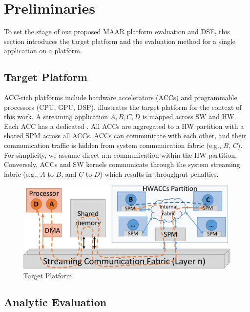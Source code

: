 \vspace{-2pt}
\section{Preliminaries}
\label{sec:pre}

To set the stage of our proposed MAAR platform evaluation and DSE, this section introduces the target platform and the evaluation method for a single application on a platform.


\subsection{Target Platform}

ACC-rich platforms include hardware accelerators (ACCs) and programmable processors (CPU, GPU, DSP).  illustrates the target platform for the context of this work. A streaming application $A, B, C, D$ is mapped across SW and HW. Each ACC has a dedicated . All ACCs are aggregated to a HW partition with a shared SPM across all ACCs. ACCs can communicate with each other, and their communication traffic is hidden from system communication fabric (e.g., $B$, $C$). For simplicity, we assume direct n:n communication within the HW partition. Conversely, ACCs and SW kernels communicate through the system streaming fabric (e.g., $A$ to $B$, and $C$ to $D$) which results in throughput penalties.

\vspace{-2pt}
\begin{figure}[h]
	\centering
	\includegraphics[width=.8\linewidth]{fig/pPlat.pdf}
	\vspace{-4pt}
	\caption{Target Platform}
	\label{fig:plat}
\end{figure}


\vspace{-2pt}
\subsection{Analytic Evaluation}
\label{subsec:ana}

